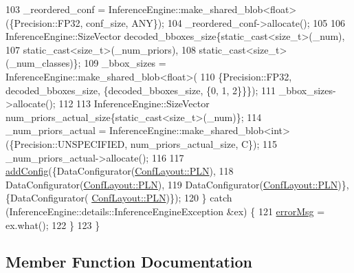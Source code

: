 \begin{DoxyCode}
103             \_reordered\_conf = InferenceEngine::make\_shared\_blob<float>(\{Precision::FP32, conf\_size, ANY\});
104             \_reordered\_conf->allocate();
105 
106             InferenceEngine::SizeVector decoded\_bboxes\_size\{\textcolor{keyword}{static\_cast<}\textcolor{keywordtype}{size\_t}\textcolor{keyword}{>}(\_num),
107                                                             static\_cast<size\_t>(\_num\_priors),
108                                                             \textcolor{keyword}{static\_cast<}\textcolor{keywordtype}{size\_t}\textcolor{keyword}{>}(\_num\_classes)\};
109             \_bbox\_sizes = InferenceEngine::make\_shared\_blob<float>(
110                     \{Precision::FP32, decoded\_bboxes\_size, \{decoded\_bboxes\_size, \{0, 1, 2\}\}\});
111             \_bbox\_sizes->allocate();
112 
113             InferenceEngine::SizeVector num\_priors\_actual\_size\{\textcolor{keyword}{static\_cast<}\textcolor{keywordtype}{size\_t}\textcolor{keyword}{>}(\_num)\};
114             \_num\_priors\_actual = InferenceEngine::make\_shared\_blob<int>(\{Precision::UNSPECIFIED, 
      num\_priors\_actual\_size, C\});
115             \_num\_priors\_actual->allocate();
116 
117             \hyperlink{classInferenceEngine_1_1Extensions_1_1Cpu_1_1ExtLayerBase_a0ac7a6632e95b9500d5246b05b4b0bfa}{addConfig}(\{DataConfigurator(\hyperlink{classInferenceEngine_1_1Extensions_1_1Cpu_1_1ExtLayerBase_a1258a8d209e0249e0b1717618352ddfba446687ea2db1ada75be5ed053be77f59}{ConfLayout::PLN}),
118                        DataConfigurator(\hyperlink{classInferenceEngine_1_1Extensions_1_1Cpu_1_1ExtLayerBase_a1258a8d209e0249e0b1717618352ddfba446687ea2db1ada75be5ed053be77f59}{ConfLayout::PLN}),
119                        DataConfigurator(\hyperlink{classInferenceEngine_1_1Extensions_1_1Cpu_1_1ExtLayerBase_a1258a8d209e0249e0b1717618352ddfba446687ea2db1ada75be5ed053be77f59}{ConfLayout::PLN})\}, \{DataConfigurator(
      \hyperlink{classInferenceEngine_1_1Extensions_1_1Cpu_1_1ExtLayerBase_a1258a8d209e0249e0b1717618352ddfba446687ea2db1ada75be5ed053be77f59}{ConfLayout::PLN})\});
120         \} \textcolor{keywordflow}{catch} (InferenceEngine::details::InferenceEngineException &ex) \{
121             \hyperlink{classInferenceEngine_1_1Extensions_1_1Cpu_1_1ExtLayerBase_abc78e9b5a79fa339ffd831a5318f71f7}{errorMsg} = ex.what();
122         \}
123     \}
\end{DoxyCode}


\subsection{Member Function Documentation}
